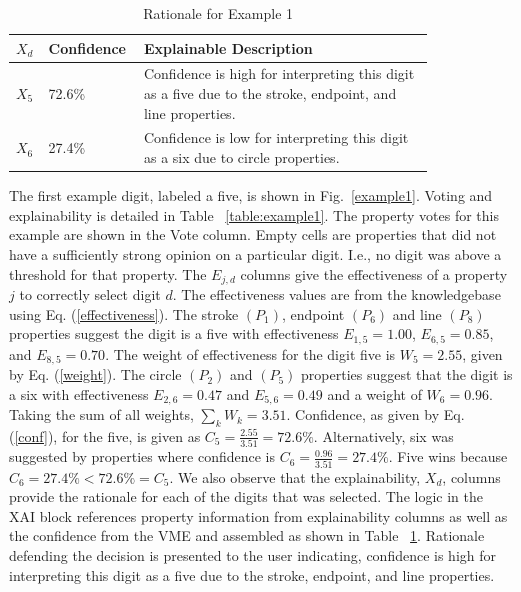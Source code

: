 \documentclass[conference]{IEEEtran}
\begin{document}
\begin{table}[htbp]
\caption{Rationale for Example 1}
\centering
\begin{tabular}{| p{0.04\linewidth} | p{0.14\linewidth} | p{0.65\linewidth} |}
\hline
 $X_d$ & Confidence & Explainable Description \\
\hline \cline{1-3}
$X_5$ & 72.6\% & Confidence is high for interpreting this digit as a five due to the stroke, endpoint, and line properties. \\ 
\hline
$X_6$ & 27.4\% & Confidence is low for interpreting this digit as a six due to circle properties. \\
\hline
\end{tabular}
\label{table:exexample1}
\end{table}

The first example digit, labeled a five, is shown in Fig.~\ref{example1}.  Voting and explainability is detailed in Table ~\ref{table:example1}.  The property votes for this example are shown in the Vote column.  Empty cells are properties that did not have a sufficiently strong opinion on a particular digit.  I.e., no digit was above a threshold for that property.   The $E_{j,d}$ columns give the effectiveness of a property $j$ to correctly select digit $d$.  The effectiveness values are from the knowledgebase using Eq. (\ref{effectiveness}).   The stroke $(P_1)$, endpoint $(P_6)$ and line $(P_8)$ properties suggest the digit is a five with effectiveness $E_{1,5}= 1.00$, $E_{6,5}=0.85$, and $E_{8,5}=0.70$.  The weight of effectiveness for the digit five is $W_5=2.55$, given by Eq. (\ref{weight}).  The circle $(P_2)$ and $(P_5)$ properties suggest that the digit is a six with effectiveness $E_{2,6}=0.47$ and $E_{5,6}=0.49$  and a weight of $W_6=0.96$.  Taking the sum of all weights, $\sum\limits_k W_k=3.51$.  Confidence, as given by Eq. (\ref{conf}), for the five, is given as $C_5=\frac{2.55}{3.51} = 72.6\%$.  Alternatively, six was suggested by properties where confidence is $C_6=\frac{0.96}{3.51}=27.4\%$.  Five wins because $C_6=27.4\% < 72.6\%=C_5$.  We also observe that the explainability, $X_d$, columns provide the rationale for each of the digits that was selected.  The logic in the XAI block references property information from explainability columns as well as the confidence from the VME and assembled as shown in Table~ \ref{table:exexample1}.   Rationale defending the decision is presented to the user indicating, confidence is high for interpreting this digit as a five due to the stroke, endpoint, and line properties. 
\end{document}
